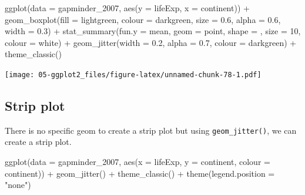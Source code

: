 \documentclass[
]{book}
\newenvironment{Shaded}{\begin{snugshade}}{\end{snugshade}}
\newcommand{\AttributeTok}[1]{\textcolor[rgb]{0.77,0.63,0.00}{#1}}
\newcommand{\DecValTok}[1]{\textcolor[rgb]{0.00,0.00,0.81}{#1}}
\newcommand{\FloatTok}[1]{\textcolor[rgb]{0.00,0.00,0.81}{#1}}
\newcommand{\FunctionTok}[1]{\textcolor[rgb]{0.00,0.00,0.00}{#1}}
\newcommand{\NormalTok}[1]{#1}
\newcommand{\SpecialCharTok}[1]{\textcolor[rgb]{0.00,0.00,0.00}{#1}}
\newcommand{\StringTok}[1]{\textcolor[rgb]{0.31,0.60,0.02}{#1}}
\begin{document}
\begin{Shaded}
\begin{Highlighting}[]
\FunctionTok{ggplot}\NormalTok{(}\AttributeTok{data =}\NormalTok{ gapminder\_2007, }\FunctionTok{aes}\NormalTok{(}\AttributeTok{y =}\NormalTok{ lifeExp, }\AttributeTok{x =}\NormalTok{ continent)) }\SpecialCharTok{+} 
   \FunctionTok{geom\_boxplot}\NormalTok{(}\AttributeTok{fill =} \StringTok{\textquotesingle{}lightgreen\textquotesingle{}}\NormalTok{, }
                \AttributeTok{colour =} \StringTok{\textquotesingle{}darkgreen\textquotesingle{}}\NormalTok{, }
                \AttributeTok{size =} \FloatTok{0.6}\NormalTok{, }
                \AttributeTok{alpha =} \FloatTok{0.6}\NormalTok{, }
                \AttributeTok{width =} \FloatTok{0.3}\NormalTok{) }\SpecialCharTok{+}
   \FunctionTok{stat\_summary}\NormalTok{(}\AttributeTok{fun.y =}\NormalTok{ mean, }\AttributeTok{geom =} \StringTok{\textquotesingle{}point\textquotesingle{}}\NormalTok{, }\AttributeTok{shape =} \StringTok{\textquotesingle{}{-}\textquotesingle{}}\NormalTok{, }\AttributeTok{size =} \DecValTok{10}\NormalTok{, }\AttributeTok{colour =} \StringTok{\textquotesingle{}white\textquotesingle{}}\NormalTok{) }\SpecialCharTok{+}
   \FunctionTok{geom\_jitter}\NormalTok{(}\AttributeTok{width =} \FloatTok{0.2}\NormalTok{, }\AttributeTok{alpha =} \FloatTok{0.7}\NormalTok{, }\AttributeTok{colour =} \StringTok{\textquotesingle{}darkgreen\textquotesingle{}}\NormalTok{) }\SpecialCharTok{+}
   \FunctionTok{theme\_classic}\NormalTok{()}
\end{Highlighting}
\end{Shaded}

\texttt{[image: 05-ggplot2\_files/figure-latex/unnamed-chunk-78-1.pdf]}

\hypertarget{strip-plot}{%
\subsection{Strip plot}\label{strip-plot}}

There is no specific geom to create a strip plot but using \texttt{geom\_jitter()}, we can create a strip plot.

\begin{Shaded}
\begin{Highlighting}[]
\FunctionTok{ggplot}\NormalTok{(}\AttributeTok{data =}\NormalTok{ gapminder\_2007, }\FunctionTok{aes}\NormalTok{(}\AttributeTok{x =}\NormalTok{ lifeExp, }\AttributeTok{y =}\NormalTok{ continent, }\AttributeTok{colour =}\NormalTok{ continent)) }\SpecialCharTok{+} 
   \FunctionTok{geom\_jitter}\NormalTok{() }\SpecialCharTok{+}
   \FunctionTok{theme\_classic}\NormalTok{() }\SpecialCharTok{+}
   \FunctionTok{theme}\NormalTok{(}\AttributeTok{legend.position =} \StringTok{"none"}\NormalTok{)}
\end{Highlighting}
\end{Shaded}
\end{document}
